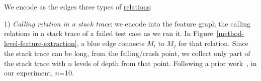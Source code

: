 

We encode as the edges three types of \underline{relations}:

1) {\em Calling relation in a stack trace}: we encode into
the feature graph the calling relations in a stack trace of a failed
test case as we ran it.
%
In Figure~\ref{method-level-feature-extraction}, a blue edge connects
$M_i$ to $M_j$ for that relation. Since the stack trace can be long,
from the failing/crash point, we collect only part of the stack trace
with $n$ levels of depth from that point. Following a prior
work~\cite{crashlocator-issta14}, in our experiment, $n$=10.

